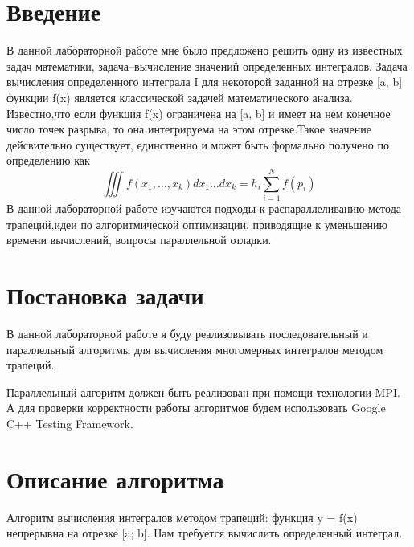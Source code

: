 \documentclass{report}
\begin{document}
\setcounter{page}{2}

\tableofcontents
\newpage

\section*{Введение}
\par В данной лабораторной работе мне было предложено решить одну из известных задач математики, задача–вычисление значений определенных интегралов.
Задача вычисления определенного интеграла I для некоторой заданной на отрезке [a, b] функции f(x) является классической задачей математического анализа. Известно,что если функция f(x) ограничена на [a, b] и имеет на нем конечное число точек разрыва, то она интегрируема на этом отрезке.Такое значение дейсвительно существует, единственно и может быть формально получено по определению как\\
\begin{equation}\iiint{f(x_1,\dots,x_k) dx_1 \dots dx_k} = h_i\sum_{i=1}^{N}{f(p_{i})} \end{equation}
В данной лабораторной работе изучаются подходы к распараллеливанию метода трапеций,идеи по алгоритмической оптимизации, приводящие к уменьшению времени вычислений, вопросы параллельной отладки.
\newpage

\section*{Постановка задачи}
\par В данной лабораторной работе я буду реализовывать последовательный и параллельный алгоритмы для вычисления многомерных  интегралов методом трапеций.

\par Параллельный алгоритм должен быть реализован  при помощи технологии MPI. А для проверки корректности работы алгоритмов будем использовать Google C++ Testing Framework.
\newpage

\section*{Описание алгоритма}
\par {}
Алгоритм вычисления интегралов методом трапеций:
 функция y = f(x) непрерывна на отрезке [a; b]. Нам требуется вычислить определенный интеграл.
\end{document}
